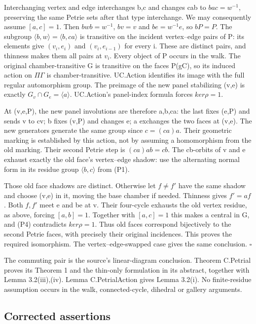 Interchanging vertex and edge interchanges b,c and changes cab to
\(bac=w^{-1}\), preserving the same Petrie sets after that type
interchange. We may consequently assume \([a,c]=1\). Then
\(bwb=w^{-1}\), \(bv=v\) and \(be=w^{-1}e\), so \(bP=P\). The subgroup
\(\langle b,w\rangle =\langle b,ca\rangle\) is transitive on the
incident vertex--edge pairs of P: its elements give \((v_i,e_i)\) and
\((v_i,e_{i-1})\) for every i. These are distinct pairs, and thinness
makes them all pairs at \(v_i\). Every object of P occurs in the walk.
The original chamber-transitive G is transitive on the faces P(gC), so
its induced action on \(\Pi \Gamma\) is chamber-transitive. UC.Action
identifies its image with the full regular automorphism group. The
preimage of the new panel stabilizing (v,e) is exactly
\(G_v\cap G_e=\langle a\rangle\). UC.Action's panel-index formula forces
\(ker\rho =1\).

At (v,e,P), the new panel involutions are therefore a,b,ca: the last
fixes (e,P) and sends v to cv; b fixes (v,P) and changes e; a exchanges
the two faces at (v,e). The new generators generate the same group since
\(c=(ca)a\). Their geometric marking is established by this action, not
by assuming a homomorphism from the old marking. Their second Petrie
step is \((ca)ab=cb\). The cb-orbits of v and e exhaust exactly the old
face's vertex--edge shadow: use the alternating normal form in its
residue group \(\langle b,c\rangle\) from (P1).

Those old face shadows are distinct. Otherwise let \(f\ne f'\) have the
same shadow and choose (v,e) in it, moving the base chamber if needed.
Thinness gives \(f'=af\). Both \(f,f'\) meet e and be at v. Their
four-cycle exhausts the old vertex residue, as above, forcing
\([a,b]=1\). Together with \([a,c]=1\) this makes a central in G, and
(P4) contradicts \(ker\rho =1\). Thus old faces correspond bijectively
to the second Petrie faces, with precisely their original incidences.
This proves the required isomorphism. The vertex--edge-swapped case
gives the same conclusion. \(\square\)

The commuting pair is the source's linear-diagram conclusion. Theorem
C.Petrial proves its Theorem 1 and the thin-only formulation in its
abstract, together with Lemma 3.2(iii),(iv). Lemma C.PetrialAction gives
Lemma 3.2(i). No finite-residue assumption occurs in the walk,
connected-cycle, dihedral or gallery arguments.

\subsection{Corrected assertions}\label{corrected-assertions}

